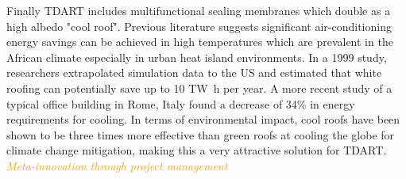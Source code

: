 \documentclass[justified]{tufte-book}
\begin{document}
\par Finally TDART includes multifunctional sealing %
membranes which double as a high albedo "cool roof". Previous literature suggests significant air-conditioning energy savings can be achieved in high temperatures which are prevalent in the African climate\cite{akbari2003measured, akbari1999cooling} especially in urban heat island environments. In a 1999 study, researchers extrapolated simulation data to the US and estimated that white roofing can potentially save up to 10 \si{{\tera\watt\hour}} per year. A more recent study\cite{pisello2013active} of a typical office building in Rome, Italy found a decrease of 34\% in energy requirements for cooling. In terms of environmental impact, cool roofs have been shown to be three times more effective than green roofs at cooling the globe for climate change mitigation\cite{sproul2014economic}, making this a very attractive solution for TDART.
	\vspace*{2cm}\\
	\textcolor{orange}{\textit{\Huge{Meta-innovation through project management}}}
	\vspace*{2cm}\\
\end{document}
